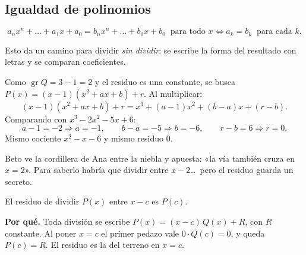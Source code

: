 \documentclass[11pt,a4paper]{article}
\newcommand{\gr}{\operatorname{gr}}
\begin{document}
\subsection{Igualdad de polinomios}
\begin{propiedad}
\[ a_nx^n+\dots+a_1x+a_0=b_nx^n+\dots+b_1x+b_0\ \text{ para todo }x \iff a_k=b_k\ \text{ para cada }k . \]
\end{propiedad}
Esto da un camino para dividir \emph{sin dividir}: se escribe la forma del resultado con letras y se comparan coeficientes.
\begin{ejemplo}
Como $\gr Q=3-1=2$ y el residuo es una constante, se busca $P(x)=(x-1)\left(x^2+ax+b\right)+r$. Al multiplicar:
\[ (x-1)\left(x^2+ax+b\right)+r=x^3+(a-1)x^2+(b-a)x+(r-b). \]
Comparando con $x^3-2x^2-5x+6$:
\[ a-1=-2\Rightarrow a=-1,\qquad b-a=-5\Rightarrow b=-6,\qquad r-b=6\Rightarrow r=0 . \]
Mismo cociente $x^2-x-6$ y mismo residuo $0$.
\end{ejemplo}


Beto ve la cordillera de Ana entre la niebla y apuesta: «la vía también cruza en $x=2$». Para saberlo habría que
dividir entre $x-2$\dots\ pero el residuo guarda un secreto.

\begin{propiedad}
El residuo de dividir $P(x)$ entre $x-c$ es $P(c)$.
\end{propiedad}
\textbf{Por qué.} Toda división se escribe $P(x)=(x-c)\,Q(x)+R$, con $R$ constante. Al poner $x=c$ el primer
pedazo vale $0\cdot Q(c)=0$, y queda $P(c)=R$. El residuo es la  del terreno en $x=c$.
\end{document}
